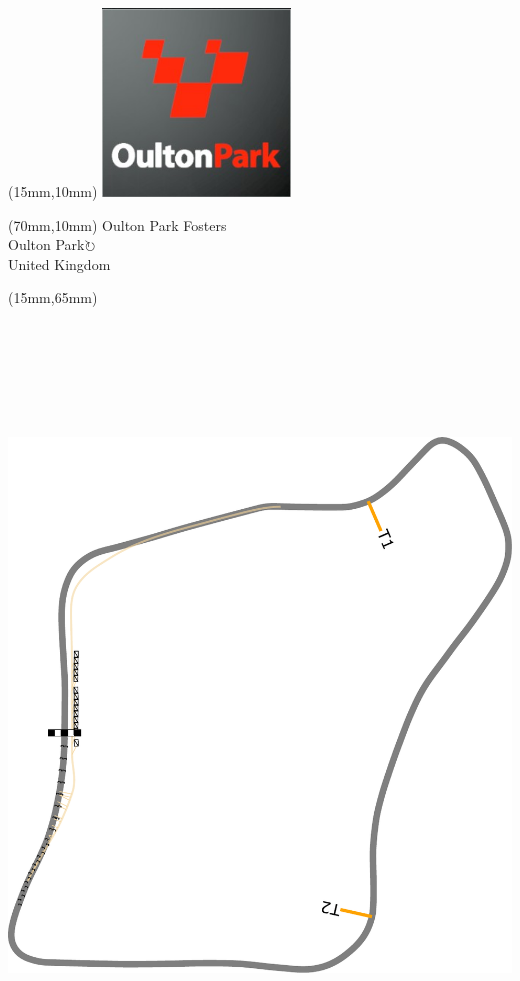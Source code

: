 \null\newpage
\begin{textblock*}{50mm}(15mm,10mm)%
\includegraphics[width=50mm]{LG/2015-05-20_00091.png}
\end{textblock*}
\begin{textblock*}{130mm}(70mm,10mm)%
{\fontsize{20}{20}\selectfont Oulton Park Fosters\\}
{\fontsize{16}{16}\selectfont Oulton Park\hfill \Large$\circlearrowright$\\}
{\fontsize{12}{12}\selectfont United Kingdom\\}
\end{textblock*}
\begin{textblock*}{185mm}(15mm,65mm)%
\centering
\mbox{\includegraphics[width=185mm,height=210mm,keepaspectratio]{PT/OUPAFO.pdf}}
\end{textblock*}
